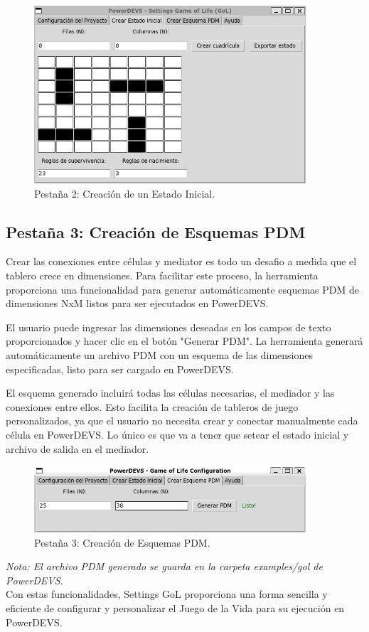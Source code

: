 \documentclass[]{article}
\begin{document}
\begin{figure}[H]
  \centering
  \includegraphics[width=0.9\textwidth]{../assets/gui/pestania2.png}
  \caption{Pestaña 2: Creación de un Estado Inicial.}
  \label{fig:tab2}
\end{figure}

\subsection{Pestaña 3: Creación de Esquemas PDM}
Crear las conexiones entre células y mediator es todo un desafio a medida que el tablero crece en dimensiones. Para facilitar este proceso, la herramienta proporciona una funcionalidad para generar automáticamente esquemas PDM de dimensiones NxM listos para ser ejecutados en PowerDEVS.

El usuario puede ingresar las dimensiones deseadas en los campos de texto proporcionados y hacer clic en el botón "Generar PDM". La herramienta generará automáticamente un archivo PDM con un esquema de las dimensiones especificadas, listo para ser cargado en PowerDEVS.

El esquema generado incluirá todas las células necesarias, el mediador y las conexiones entre ellos. Esto facilita la creación de tableros de juego personalizados, ya que el usuario no necesita crear y conectar manualmente cada célula en PowerDEVS.
Lo único es que va a tener que setear el estado inicial y archivo de salida en el mediador.

\begin{figure}[H]
  \centering
  \includegraphics[width=0.9\textwidth]{../assets/gui/pestania3.png}  \caption{Pestaña 3: Creación de Esquemas PDM.}
  \label{fig:tab3}
\end{figure}

\textit{Nota: El archivo PDM generado se guarda en la carpeta examples/gol de PowerDEVS.}\\


Con estas funcionalidades, Settings GoL proporciona una forma sencilla y eficiente de configurar y personalizar el Juego de la Vida para su ejecución en PowerDEVS.
\end{document}
